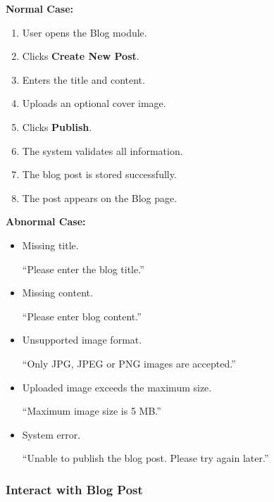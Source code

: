 \vspace{0.2cm}

\textbf{Normal Case:}

\begin{enumerate}
    \item User opens the Blog module.
    \item Clicks \textbf{Create New Post}.
    \item Enters the title and content.
    \item Uploads an optional cover image.
    \item Clicks \textbf{Publish}.
    \item The system validates all information.
    \item The blog post is stored successfully.
    \item The post appears on the Blog page.
\end{enumerate}

\vspace{0.2cm}

\textbf{Abnormal Case:}

\begin{itemize}
    \item Missing title.

    ``Please enter the blog title.''

    \item Missing content.

    ``Please enter blog content.''

    \item Unsupported image format.

    ``Only JPG, JPEG or PNG images are accepted.''

    \item Uploaded image exceeds the maximum size.

    ``Maximum image size is 5 MB.''

    \item System error.

    ``Unable to publish the blog post. Please try again later.''
\end{itemize}



\subsubsection{Interact with Blog Post}

